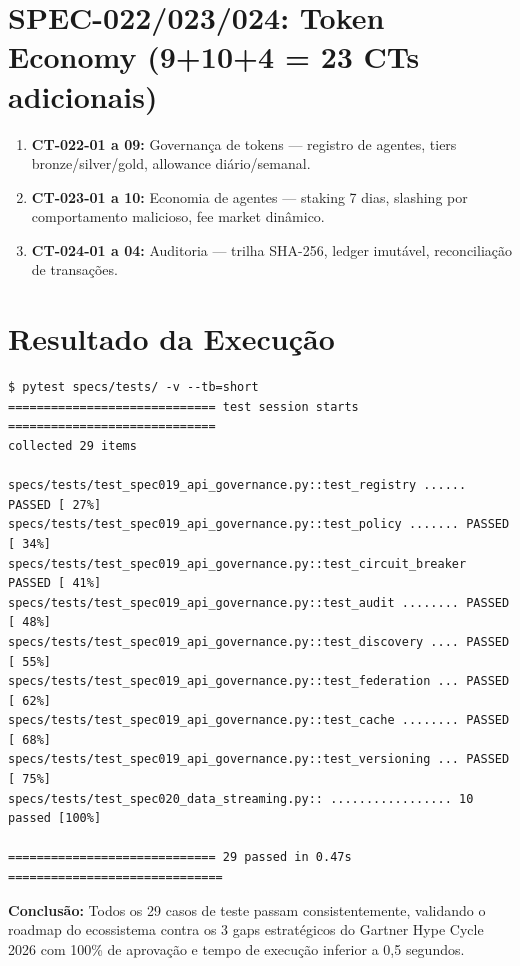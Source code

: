 \section{SPEC-022/023/024: Token Economy (9+10+4 = 23 CTs adicionais)}

\begin{enumerate}
  \item \textbf{CT-022-01 a 09:} Governança de tokens --- registro de agentes, tiers bronze/silver/gold, allowance diário/semanal.
  \item \textbf{CT-023-01 a 10:} Economia de agentes --- staking 7 dias, slashing por comportamento malicioso, fee market dinâmico.
  \item \textbf{CT-024-01 a 04:} Auditoria --- trilha SHA-256, ledger imutável, reconciliação de transações.
\end{enumerate}

\section{Resultado da Execução}

\begin{lstlisting}[basicstyle=\ttfamily\scriptsize, breaklines=true, breakatwhitespace=false, postbreak=\mbox{$\hookrightarrow$\space}]
$ pytest specs/tests/ -v --tb=short
============================= test session starts =============================
collected 29 items

specs/tests/test_spec019_api_governance.py::test_registry ...... PASSED [ 27%]
specs/tests/test_spec019_api_governance.py::test_policy ....... PASSED [ 34%]
specs/tests/test_spec019_api_governance.py::test_circuit_breaker PASSED [ 41%]
specs/tests/test_spec019_api_governance.py::test_audit ........ PASSED [ 48%]
specs/tests/test_spec019_api_governance.py::test_discovery .... PASSED [ 55%]
specs/tests/test_spec019_api_governance.py::test_federation ... PASSED [ 62%]
specs/tests/test_spec019_api_governance.py::test_cache ........ PASSED [ 68%]
specs/tests/test_spec019_api_governance.py::test_versioning ... PASSED [ 75%]
specs/tests/test_spec020_data_streaming.py:: ................. 10 passed [100%]

============================= 29 passed in 0.47s ==============================
\end{lstlisting}

\textbf{Conclusão:} Todos os 29 casos de teste passam consistentemente, validando o roadmap do ecossistema contra os 3 gaps estratégicos do Gartner Hype Cycle 2026 com 100\% de aprovação e tempo de execução inferior a 0,5 segundos.

\newpage
